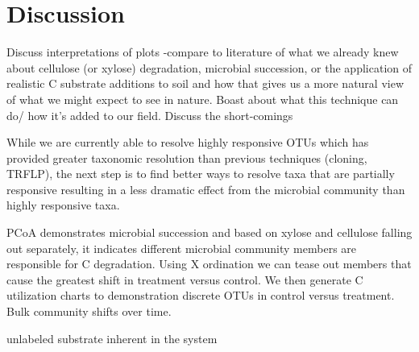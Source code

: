 \section{Discussion}
Discuss interpretations of plots
    -compare to literature of what we already knew about cellulose (or xylose) degradation, microbial succession, or the application of realistic C substrate additions to soil and how that gives us a more natural view of what we might expect to see in nature.  
Boast about what this technique can do/ how it's added to our field.
Discuss the short-comings


While we are currently able to resolve highly responsive OTUs which has provided greater taxonomic resolution than previous techniques (cloning, TRFLP), the next step is to find better ways to resolve taxa that are partially responsive resulting in a less dramatic effect from the microbial community than highly responsive taxa.  

PCoA demonstrates microbial succession and based on xylose and cellulose falling out separately, it indicates different microbial community members are responsible for C degradation.  Using X ordination we can tease out members that cause the greatest shift in treatment versus control.  We then generate C utilization charts to demonstration discrete OTUs in control versus treatment.  Bulk community shifts over time. 

unlabeled substrate inherent in the system